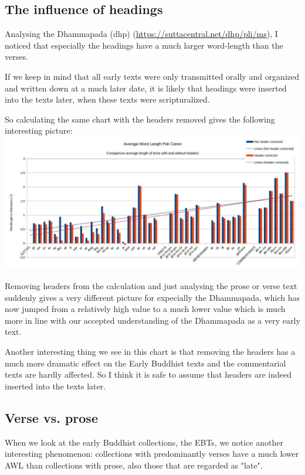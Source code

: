 \subsection{The influence of headings}
Analysing the Dhammapada (dhp) (\url{https://suttacentral.net/dhp/pli/ms}), I noticed that especially the headings have a much larger word-length than the verses. 

If we keep in mind that all early texts were only transmitted orally and organized and written down at a much later date, it is likely that headings were inserted into the texts later, when these texts were scripturalized.

So calculating the same chart with the headers removed gives the following interesting picture:\\

\includegraphics[width=\linewidth]{chart2.jpg}
\label{chart2}

\medskip
Removing headers from the calculation and just analysing the prose or verse text suddenly gives a very different picture for expecially the Dhammapada, which has now jumped from a relatively high value to a much lower value which is much more in line with our accepted understanding of the Dhammapada as a very early text.

Another interesting thing we see in this chart is that removing the headers has a much more dramatic effect on the Early Buddhist texts and the commentarial texts are hardly affected. So I think it is safe to assume that headers are indeed inserted into the texts later.

\subsection{Verse vs. prose}
When we look at the early Buddhist collections, the EBTs, we notice another interesting phenomenon: collections with predominantly verses have a much lower AWL than collections with prose, also those that are regarded as "late".

